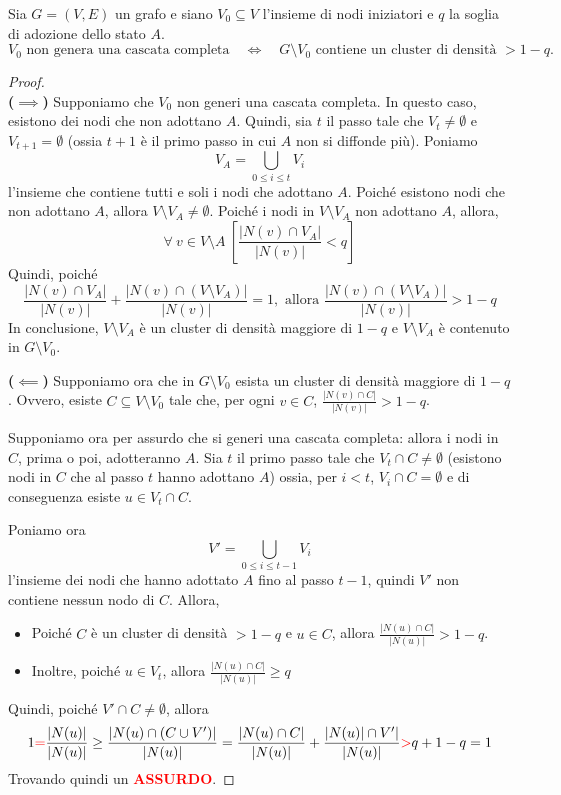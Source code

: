 \begin{teorema}
    Sia $G = (V, E)$ un grafo e siano $V_0 \subseteq V$ l'insieme di nodi iniziatori e $q$ la soglia di adozione dello stato $A$.
    \[
        V_0 \text{ non genera una cascata completa}
        \quad\Longleftrightarrow\quad
        G \setminus V_0 \text{ contiene un cluster di densità } > 1-q .
    \]
\end{teorema}
\begin{proof}
    \mbox{}\\
    \textbf{($\implies$)}\; Supponiamo che $V_0$ non generi una cascata completa. In questo caso, esistono dei nodi che non adottano $A$. Quindi, sia $t$ il passo tale che $V_t \neq \emptyset$ e  $V_{t+1} = \emptyset$ (ossia $t + 1$ è il primo passo in cui $A$ non si diffonde più). Poniamo
    \[
    V_A = \bigcup_{0 \leq i \leq t} V_i
    \]
    l'insieme che contiene tutti e soli i nodi che adottano $A$. Poiché esistono nodi che non adottano $A$, allora $V \setminus V_A \neq \emptyset$. Poiché i nodi in $V \setminus V_A$ non adottano $A$, allora, \[
    \forall\ v \in V \setminus A\ \left[\frac{|N(v) \cap V_A|}{|N(v)|} < q\right]
    \]
    Quindi, poiché 
    \[
    \frac{|N(v) \cap V_A|}{|N(v)|} + \frac{|N(v) \cap (V \setminus V_A)|}{|N(v)|} = 1, \text{ allora } \frac{|N(v) \cap (V \setminus V_A)|}{|N(v)|} > 1-q
    \]
    In conclusione, $V \setminus V_A$ è un cluster di densità maggiore di $1 - q$ e $V \setminus V_A$ è contenuto in $G \setminus V_0$.
    \medskip

    \textbf{($\impliedby$)}\; Supponiamo ora che in $G \setminus V_0$ esista un cluster di densità maggiore di $1-q$. Ovvero, esiste $C \subseteq V \setminus V_0$ tale che, per ogni $v \in C$, $\frac{|N(v) \cap C|}{|N(v)|} > 1-q$.

    Supponiamo ora per assurdo che si generi una cascata completa: allora i nodi in $C$, prima o poi, adotteranno $A$. Sia $t$ il primo passo tale che $V_t \cap C \neq \emptyset$ (esistono nodi in $C$ che al passo $t$ hanno adottano $A$) ossia, per $i < t$, $V_i \cap C = \emptyset$ e di conseguenza esiste $u \in V_t \cap C$.

    Poniamo ora
    \[
    V' = \bigcup_{0 \leq i \leq t - 1} V_i
    \]
    l'insieme dei nodi che hanno adottato $A$ fino al passo $t - 1$, quindi $V'$ non contiene nessun nodo di $C$.
    Allora,
    \begin{itemize}
        \item Poiché $C$ è un cluster di densità $> 1 - q$ e $u \in C$, allora $\frac{|N(u) \cap C|}{|N(u)|} > 1-q$.
        \item Inoltre, poiché $u \in V_t$, allora $\frac{|N(u) \cap C|}{|N(u)|} \geq q$
    \end{itemize}
    Quindi, poiché $V' \cap C \neq \emptyset$, allora
    \[
    1  \textcolor{red}{ = } \frac{|N(u)|}{|N(u)|} \geq \frac{|N(u) \cap (C \cup V')|}{|N(u)|} = \frac{|N(u) \cap C|}{|N(u)|} + \frac{|N(u)| \cap V'|}{|N(u)|}  \textcolor{red}{ > } q + 1 - q = 1
    \]
    Trovando quindi un \textbf{\textcolor{red}{ASSURDO}}.
\end{proof}

